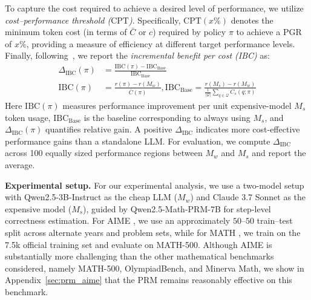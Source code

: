 \documentclass{article}
\theoremstyle{plain}
\theoremstyle{definition}
\theoremstyle{remark}
\begin{document}
To capture the cost required to achieve a desired level of performance, we utilize \emph{cost–performance threshold ($\mathrm{CPT}$)}. Specifically, $\mathrm{CPT}(x\%)$ 
denotes the minimum token cost (in terms of $\bar{C}$ or $c$) required by policy $\pi$ to achieve a $\mathrm{PGR}$ of $x\%$, providing a measure of efficiency at different target performance levels.
Finally, following~\citet{automix}, we report the \emph{incremental benefit per cost (IBC)} as:
\begin{align}
\Delta_{\text{IBC}}(\pi) &= \frac{\text{IBC}(\pi)- \text{IBC}_{\text{Base}}}{\text{IBC}_{\text{Base}}} \\ \text{IBC}(\pi) &= \frac{ r(\pi) - r(M_w) }{\bar{C}(\pi)}, \text{IBC}_{\text{Base}} = \frac{r(M_s) - r(M_w)}{\frac{1}{|\mathcal{Q}|} \sum_{q \in \mathcal{Q}} C_s(q; \pi)} \nonumber
\end{align}
Here $\text{IBC}(\pi)$ measures performance improvement per unit expensive-model $M_s$ token usage, $\text{IBC}_{\text{Base}}$ is the baseline corresponding to always using $M_s$, and $\Delta_{\text{IBC}}(\pi)$ quantifies relative gain. A positive $\Delta_{\text{IBC}}$ indicates more cost-effective performance gains than a standalone LLM.  For evaluation, we compute $\Delta_{\text{IBC}}$ across 100 equally sized performance regions between $M_w$ and $M_s$ and report the average.

\textbf{Experimental setup.} For our experimental analysis, we use a two-model setup with Qwen2.5-3B-Instruct as the cheap LLM ($M_w$) and Claude 3.7 Sonnet as the expensive model ($M_s$), guided by Qwen2.5-Math-PRM-7B for step-level correctness estimation. For AIME \citep{aime}, we use an approximately $50$–$50$ train–test split across alternate years and problem sets, while for MATH \citep{math}, we train on the 7.5k official training set and evaluate on MATH-500. Although AIME is substantially more challenging than the other mathematical benchmarks considered, namely MATH-500, OlympiadBench, and Minerva Math, we show in Appendix~\ref{sec:prm_aime} that the PRM remains reasonably effective on this benchmark.
\end{document}
